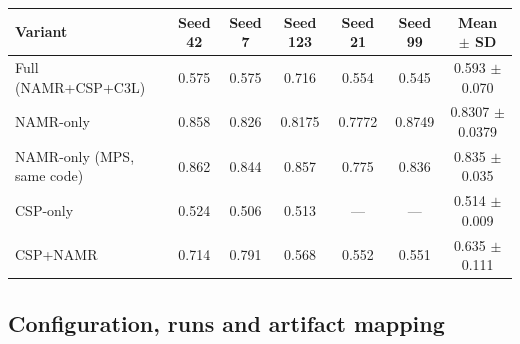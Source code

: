 \documentclass[11pt,a4paper]{article}
\begin{document}
\begin{table}[H]
\label{tab:s12}
\footnotesize
\begin{tabular}{@{}lcccccc@{}}
\toprule
\textbf{Variant} & \textbf{Seed 42} & \textbf{Seed 7} & \textbf{Seed 123} & \textbf{Seed 21} & \textbf{Seed 99} & \textbf{Mean $\pm$ SD} \\
\midrule
Full (NAMR+CSP+C3L) & 0.575 & 0.575 & 0.716 & 0.554 & 0.545 & 0.593 $\pm$ 0.070 \\
NAMR-only & 0.858 & 0.826 & 0.8175 & 0.7772 & 0.8749 & 0.8307 $\pm$ 0.0379 \\
NAMR-only (MPS, same code) & 0.862 & 0.844 & 0.857 & 0.775 & 0.836 & 0.835 $\pm$ 0.035 \\
CSP-only & 0.524 & 0.506 & 0.513 & --- & --- & 0.514 $\pm$ 0.009 \\
CSP+NAMR & 0.714 & 0.791 & 0.568 & 0.552 & 0.551 & 0.635 $\pm$ 0.111 \\
\bottomrule
\end{tabular}
\end{table}

\FloatBarrier


\subsection{Configuration, runs and artifact mapping}
\end{document}
